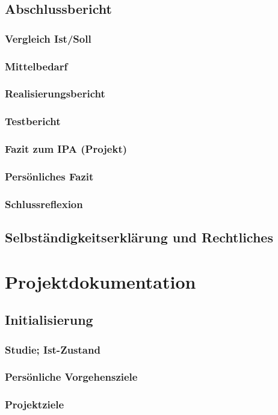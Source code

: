 \documentclass{report}
\begin{document}
\chapter{Abschlussbericht}
\section{Vergleich Ist/Soll}
\section{Mittelbedarf}
\section{Realisierungsbericht}
\section{Testbericht}
\section{Fazit zum IPA (Projekt)}
\section{Persönliches Fazit}
\section{Schlussreflexion}

\chapter{Selbständigkeitserklärung und Rechtliches}

\part{Projektdokumentation}

\chapter{Initialisierung}
\section{Studie; Ist-Zustand}
\section{Persönliche Vorgehensziele}
\section{Projektziele}
\end{document}
